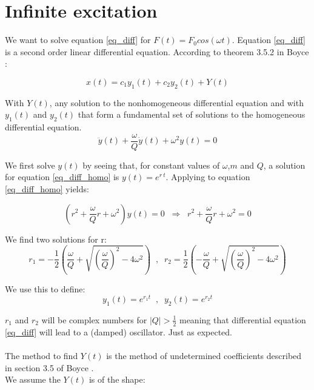 \section{Infinite excitation}

We want to solve equation \ref{eq_diff} for $F(t) = F_0 cos(\omega t)$. Equation \ref{eq_diff} is a second order linear differential equation. According to theorem 3.5.2 in Boyce \cite{Boyce}:

\begin{equation}
	x(t) = c_1 y_1(t) + c_2 y_2(t) + Y(t)
	\label{eq_x_1_emtpy}
\end{equation}

With $Y(t)$, any solution to the nonhomogeneous differential equation and with $y_1(t)$ and $y_2(t)$ that form a fundamental set of solutions to the homogeneous differential equation.
\begin{equation}
	\ddot{y}(t) + \frac{\omega}{Q} \dot{y}(t) + \omega^2 y(t) = 0
	\label{eq_diff_homo}
\end{equation}

We first solve $y(t)$ by seeing that, for constant values of $\omega$,$m$ and $Q$, a solution for equation \ref{eq_diff_homo} is  $y(t) = e^{r \: t}$. Applying to equation \ref{eq_diff_homo} yields:

\begin{equation}
	(r^2 + \frac{\omega}{Q} r + \omega^2) y(t) = 0 \; \; \Rightarrow \; \; r^2 + \frac{\omega}{Q} r + \omega^2 = 0
	\label{eq_characteristic}
\end{equation}

We find two solutions for r:
\begin{equation*}
	r_1 = - \frac{1}{2} \left( \frac{\omega}{Q} + \sqrt{\left( \frac{\omega}{Q} \right)^2 -4 \omega^2} \right) \; \; , \; \; r_2 = \frac{1}{2} \left( -\frac{\omega}{Q} + \sqrt{\left( \frac{\omega}{Q} \right)^2 -4 \omega^2} \right)
\end{equation*}

We use this to define:
\begin{equation*}
	y_1(t) = e^{r_1 t} \; \; , \; \; y_2(t) = e^{r_2 t}
\end{equation*}

$r_1$ and $r_2$ will be complex numbers for $\mid Q \mid > \frac{1}{2}$ meaning that differential equation \ref{eq_diff} will lead to a (damped) oscillator. Just as expected.\\
\\
The method to find $Y(t)$ is the method of undetermined coefficients described in section 3.5 of Boyce \cite{Boyce}.\\
We assume the $Y(t)$ is of the shape:

